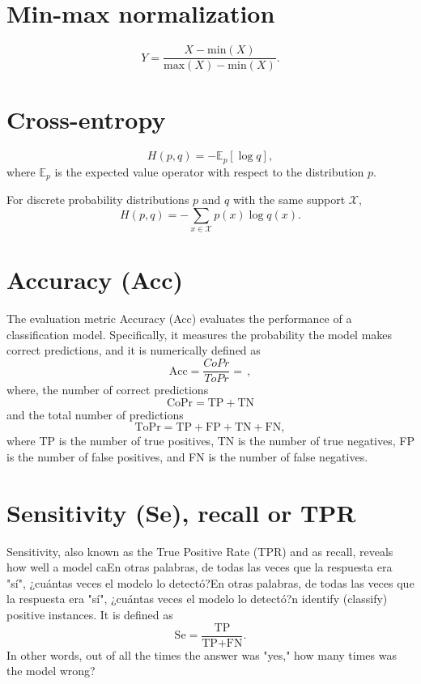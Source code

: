 \section{Min-max normalization}
\begin{equation}
  Y = \frac{X-\text{min}(X)}{\text{max}(X)-\text{min}(X)}.
\end{equation}

\section{Cross-entropy}
\begin{equation}
  H(p,q) = -\mathbb{E}_p[\log q],
\end{equation}
where $\mathbb{E}_p$ is the expected value operator with respect to
the distribution $p$.

For discrete probability distributions $p$ and $q$ with the same support $\mathcal{X}$,
\begin{equation}
  H(p,q) = -\sum_{x\in\mathcal{X}}p(x)\log q(x).
\end{equation}

\section{Accuracy (Acc)}
The evaluation metric Accuracy (Acc) evaluates the performance of a
classification model. Specifically, it measures the probability the model
makes correct predictions, and it is numerically defined as
\begin{equation}
  \text{Acc} = \frac{CoPr}{ToPr} = \frac{}{},
\end{equation}
where, the number of correct predictions
\begin{equation}
  \text{CoPr} = \text{TP} + \text{TN}
\end{equation}
and the total number of predictions
\begin{equation}
  \text{ToPr} = \text{TP} + \text{FP} + \text{TN} + \text{FN},
\end{equation}
where TP is the number of true positives, TN is the number of true
negatives, FP is the number of false positives, and FN is the number
of false negatives.

\section{Sensitivity (Se), recall or TPR}
Sensitivity, also known as the True Positive Rate (TPR) and as recall,
reveals how well a model caEn otras palabras, de todas las veces que la respuesta era "sí", ¿cuántas veces el modelo lo detectó?En otras palabras, de todas las veces que la respuesta era "sí", ¿cuántas veces el modelo lo detectó?n identify (classify) positive
instances. It is defined as
\begin{equation}
  \text{Se} = \frac{\text{TP}}{\text{TP} + \text{FN}}.
\end{equation}
In other words, out of all the times the answer was "yes," how many times was the model wrong?

